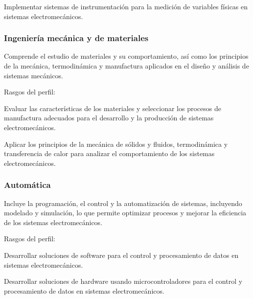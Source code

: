 \begin{cuadroazul}[IEE03]
Implementar sistemas de instrumentación para la medición de variables físicas en sistemas electromecánicos.
\end{cuadroazul}

\subsubsection*{Ingeniería mecánica y de materiales}

Comprende el estudio de materiales y su comportamiento, así como los principios de la mecánica, termodinámica y manufactura aplicados en el diseño y análisis de sistemas mecánicos.\par

Rasgos del perfil:\par

\begin{cuadroazul}[IMM01]
Evaluar las características de los materiales y seleccionar los procesos de manufactura adecuados para el desarrollo y la producción de sistemas electromecánicos.
\end{cuadroazul}

\begin{cuadroazul}[IMM02]
Aplicar los principios de la mecánica de sólidos y fluidos, termodinámica y transferencia de calor para analizar el comportamiento de los sistemas electromecánicos.
\end{cuadroazul}

\subsubsection*{Automática}

Incluye la programación, el control y la automatización de sistemas, incluyendo modelado y simulación, lo que permite optimizar procesos y mejorar la eficiencia de los sistemas electromecánicos.\par

Rasgos del perfil:\par

\begin{cuadroazul}[AUT01]
Desarrollar soluciones de software para el control y procesamiento de datos en sistemas electromecánicos.
\end{cuadroazul}

\begin{cuadroazul}[AUT02]
Desarrollar soluciones de hardware usando microcontroladores para el control y procesamiento de datos en sistemas electromecánicos.
\end{cuadroazul}

